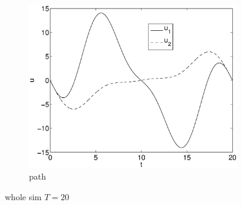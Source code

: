 \begin{figure}[h]
\begin{subfigure}[b]{\textwidth}
\centering
\includegraphics[height=0.3\textheight]{img/final_15_15_20_u.eps}
\caption{path}
\end{subfigure}
\caption{whole sim $T=20$}
\end{figure}

